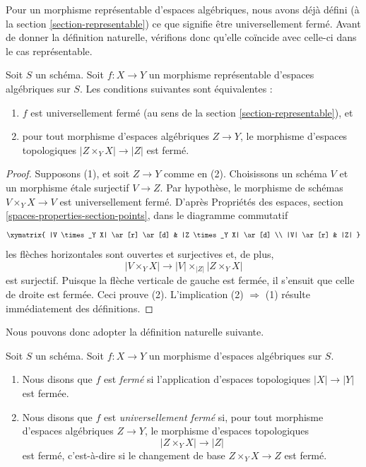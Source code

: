 \noindent
Pour un morphisme représentable d'espaces algébriques, nous avons déjà défini (à la
section \ref{section-representable})
ce que signifie être universellement fermé. Avant de donner la définition
naturelle, vérifions donc qu'elle coïncide avec celle-ci dans le cas représentable.

\begin{lemma}
\label{lemma-characterize-representable-universally-closed}
Soit $S$ un schéma. Soit $f : X \to Y$ un morphisme représentable
d'espaces algébriques sur $S$. Les conditions suivantes sont équivalentes :
\begin{enumerate}
\item $f$ est universellement fermé
(au sens de la section \ref{section-representable}), et
\item pour tout morphisme d'espaces algébriques $Z \to Y$, le morphisme
d'espaces topologiques $|Z \times_Y X| \to |Z|$ est fermé.
\end{enumerate}
\end{lemma}

\begin{proof}
Supposons (1), et soit $Z \to Y$ comme en (2). Choisissons un schéma $V$ et
un morphisme \'etale surjectif $V \to Z$. Par hypothèse, le morphisme
de schémas $V \times_Y X \to V$ est universellement fermé. D'après
Propriétés des espaces, section \ref{spaces-properties-section-points},
dans le diagramme commutatif
$$
\xymatrix{
|V \times_Y X| \ar[r] \ar[d] & |Z \times_Y X| \ar[d] \\
|V| \ar[r] & |Z|
}
$$
les flèches horizontales sont ouvertes et surjectives et, de plus,
$$
|V \times_Y X| \longrightarrow |V| \times_{|Z|} |Z \times_Y X|
$$
est surjectif. Puisque la flèche verticale
de gauche est fermée, il s'ensuit que celle de droite est
fermée. Ceci prouve (2). L'implication (2) $\Rightarrow$ (1) résulte
immédiatement des définitions.
\end{proof}

\noindent
Nous pouvons donc adopter la définition naturelle suivante.

\begin{definition}
\label{definition-closed}
Soit $S$ un schéma. Soit $f : X \to Y$ un morphisme d'espaces algébriques
sur $S$.
\begin{enumerate}
\item Nous disons que $f$ est {\it fermé} si l'application d'espaces
topologiques $|X| \to |Y|$ est fermée.
\item Nous disons que $f$ est {\it universellement fermé} si, pour tout morphisme
d'espaces algébriques $Z \to Y$, le morphisme d'espaces topologiques
$$
|Z \times_Y X| \to |Z|
$$
est fermé, c'est-à-dire si le changement de base $Z \times_Y X \to Z$ est fermé.
\end{enumerate}
\end{definition}

